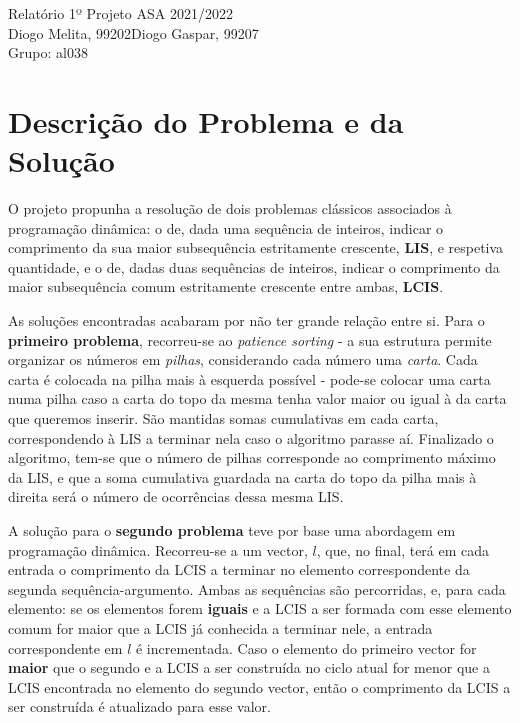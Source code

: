 \documentclass[12pt]{article}
\newcommand{\melita}{Diogo Melita, 99202}
\newcommand{\gaspar}{Diogo Gaspar, 99207}
\newcommand{\grupo}{al038}
\begin{document}
\begin{center}
{\Huge{Relatório 1º Projeto ASA 2021/2022}} \\
\vspace{0.5mm}
{\large{\melita \quad \gaspar}} \\
\vspace{0.5mm}
{\large{Grupo: \grupo}} \\
\end{center}

\section{Descrição do Problema e da Solução}
O projeto propunha a resolução de dois problemas clássicos associados à programação dinâmica: o de, dada uma sequência de inteiros, indicar o comprimento da sua maior subsequência estritamente crescente, \textbf{LIS}, e respetiva quantidade, e o de, dadas duas sequências de inteiros, indicar o comprimento da maior subsequência comum estritamente crescente entre ambas, \textbf{LCIS}. 

\vspace{0.5mm}
As soluções encontradas acabaram por não ter grande relação entre si. Para o \textbf{primeiro problema}, recorreu-se ao \textit{patience sorting} - a sua estrutura permite organizar os números em \textit{pilhas}, considerando cada número uma \textit{carta}. Cada carta é colocada na pilha mais à esquerda possível - pode-se colocar uma carta numa pilha caso a carta do topo da mesma tenha valor maior ou igual à da carta que queremos inserir. São mantidas somas cumulativas em cada carta, correspondendo à LIS a terminar nela caso o algoritmo parasse aí. Finalizado o algoritmo, tem-se que o número de pilhas corresponde ao comprimento máximo da LIS, e que a soma cumulativa guardada na carta do topo da pilha mais à direita será o número de ocorrências dessa mesma LIS.

\vspace{0.5mm}
A solução para o \textbf{segundo problema} teve por base uma abordagem em programação dinâmica. Recorreu-se a um vector, $l$, que, no final, terá em cada entrada o comprimento da LCIS a terminar no elemento correspondente da segunda sequência-argumento. Ambas as sequências são percorridas, e, para cada elemento: se os elementos forem \textbf{iguais} e a LCIS a ser formada com esse elemento comum for maior que a LCIS já conhecida a terminar nele, a entrada correspondente em $l$ é incrementada. Caso o elemento do primeiro vector for \textbf{maior} que o segundo e a LCIS a ser construída no ciclo atual for menor que a LCIS encontrada no elemento do segundo vector, então o comprimento da LCIS a ser construída é atualizado para esse valor.
\end{document}
